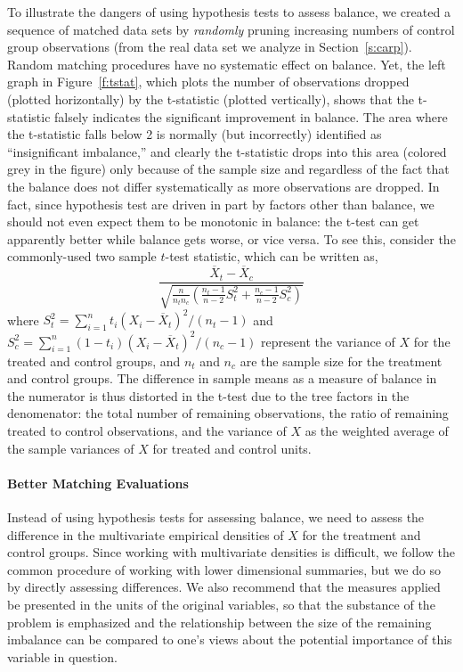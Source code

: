 \documentclass[11pt,titlepage]{article}
\begin{document}
To illustrate the dangers of using hypothesis tests to assess balance,
we created a sequence of matched data sets by \emph{randomly} pruning
increasing numbers of control group observations (from the real data
set we analyze in Section~\ref{s:carp}).  Random matching procedures
have no systematic effect on balance.  Yet, the left graph in
Figure~\ref{f:tstat}, which plots the number of observations dropped
(plotted horizontally) by the t-statistic (plotted vertically), shows
that the t-statistic falsely indicates the significant improvement in
balance.  The area where the t-statistic falls below 2 is normally
(but incorrectly) identified as ``insignificant imbalance,'' and
clearly the t-statistic drops into this area (colored grey in the
figure) only because of the sample size and regardless of the fact
that the balance does not differ systematically as more observations
are dropped.  In fact, since hypothesis test are driven in part by
factors other than balance, we should not even expect them to be
monotonic in balance: the t-test can get apparently better while
balance gets worse, or vice versa. To see this, consider the
commonly-used two sample $t$-test statistic, which can be written as,
\begin{equation}
\frac{\overline{X}_t-\overline{X}_c}{\sqrt{\frac{n}{n_tn_c}\left(\frac{n_t-1}{n-2}S^2_t + \frac{n_c-1}{n-2} S^2_c\right)}}
\end{equation} 
where $S^2_t=\sum_{i=1}^n t_i(X_i - \overline{X}_t)^2/(n_t-1)$ and
$S^2_c=\sum_{i=1}^n (1-t_i)(X_i - \overline{X}_t)^2/(n_c-1)$ represent
the variance of $X$ for the treated and control groups, and $n_t$ and
$n_c$ are the sample size for the treatment and control groups.  The
difference in sample means as a measure of balance in the numerator is
thus distorted in the t-test due to the tree factors in the
denomenator: the total number of remaining observations, the ratio of
remaining treated to control observations, and the variance of $X$ as
the weighted average of the sample variances of $X$ for treated and
control units.

\paragraph{Better Matching Evaluations}

Instead of using hypothesis tests for assessing balance, we need to
assess the difference in the multivariate empirical densities of $X$
for the treatment and control groups.  Since working with multivariate
densities is difficult, we follow the common procedure of working with
lower dimensional summaries, but we do so by directly assessing
differences.  We also recommend that the measures applied be presented
in the units of the original variables, so that the substance of the
problem is emphasized and the relationship between the size of the
remaining imbalance can be compared to one's views about the potential
importance of this variable in question.
\end{document}
